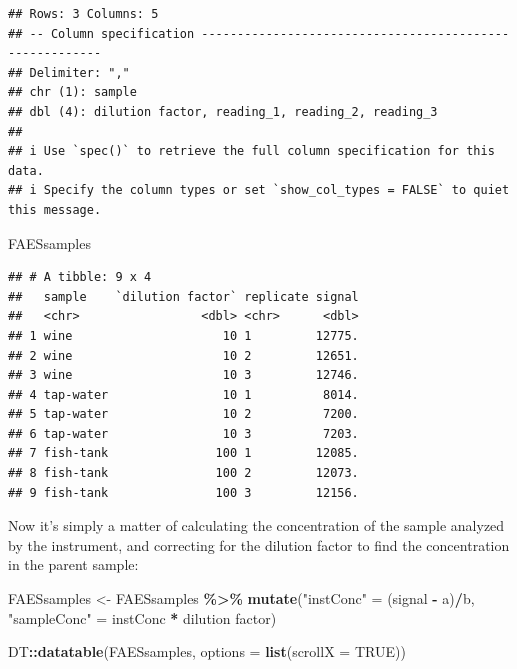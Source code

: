 \documentclass[
]{book}
\newenvironment{Shaded}{\begin{snugshade}}{\end{snugshade}}
\newcommand{\AttributeTok}[1]{\textcolor[rgb]{0.13,0.29,0.53}{#1}}
\newcommand{\ConstantTok}[1]{\textcolor[rgb]{0.56,0.35,0.01}{#1}}
\newcommand{\FunctionTok}[1]{\textcolor[rgb]{0.13,0.29,0.53}{\textbf{#1}}}
\newcommand{\NormalTok}[1]{#1}
\newcommand{\OtherTok}[1]{\textcolor[rgb]{0.56,0.35,0.01}{#1}}
\newcommand{\SpecialCharTok}[1]{\textcolor[rgb]{0.81,0.36,0.00}{\textbf{#1}}}
\newcommand{\StringTok}[1]{\textcolor[rgb]{0.31,0.60,0.02}{#1}}
\begin{document}
\begin{verbatim}
## Rows: 3 Columns: 5
## -- Column specification --------------------------------------------------------
## Delimiter: ","
## chr (1): sample
## dbl (4): dilution factor, reading_1, reading_2, reading_3
## 
## i Use `spec()` to retrieve the full column specification for this data.
## i Specify the column types or set `show_col_types = FALSE` to quiet this message.
\end{verbatim}

\begin{Shaded}
\begin{Highlighting}[]
\NormalTok{FAESsamples}
\end{Highlighting}
\end{Shaded}

\begin{verbatim}
## # A tibble: 9 x 4
##   sample    `dilution factor` replicate signal
##   <chr>                 <dbl> <chr>      <dbl>
## 1 wine                     10 1         12775.
## 2 wine                     10 2         12651.
## 3 wine                     10 3         12746.
## 4 tap-water                10 1          8014.
## 5 tap-water                10 2          7200.
## 6 tap-water                10 3          7203.
## 7 fish-tank               100 1         12085.
## 8 fish-tank               100 2         12073.
## 9 fish-tank               100 3         12156.
\end{verbatim}

Now it's simply a matter of calculating the concentration of the sample analyzed by the instrument, and correcting for the dilution factor to find the concentration in the parent sample:

\begin{Shaded}
\begin{Highlighting}[]
\NormalTok{FAESsamples }\OtherTok{\textless{}{-}}\NormalTok{ FAESsamples }\SpecialCharTok{\%\textgreater{}\%}
  \FunctionTok{mutate}\NormalTok{(}\StringTok{"instConc"} \OtherTok{=}\NormalTok{ (signal }\SpecialCharTok{{-}}\NormalTok{ a)}\SpecialCharTok{/}\NormalTok{b,}
         \StringTok{"sampleConc"} \OtherTok{=}\NormalTok{ instConc }\SpecialCharTok{*} \StringTok{\textasciigrave{}}\AttributeTok{dilution factor}\StringTok{\textasciigrave{}}\NormalTok{)}

\NormalTok{DT}\SpecialCharTok{::}\FunctionTok{datatable}\NormalTok{(FAESsamples, }\AttributeTok{options =} \FunctionTok{list}\NormalTok{(}\AttributeTok{scrollX =} \ConstantTok{TRUE}\NormalTok{))}
\end{Highlighting}
\end{Shaded}
\end{document}
